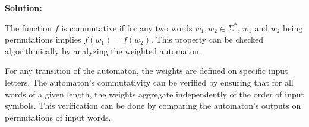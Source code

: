 \documentclass[a4paper,12pt]{article}
\begin{document}
\vspace{1cm}
\textbf{Solution:}

The function \( f \) is commutative if for any two words \( w_1, w_2 \in \Sigma^* \), \( w_1 \) and \( w_2 \) being permutations implies \( f(w_1) = f(w_2) \). This property can be checked algorithmically by analyzing the weighted automaton. 

For any transition of the automaton, the weights are defined on specific input letters. The automaton's commutativity can be verified by ensuring that for all words of a given length, the weights aggregate independently of the order of input symbols. This verification can be done by comparing the automaton's outputs on permutations of input words.
\end{document}
